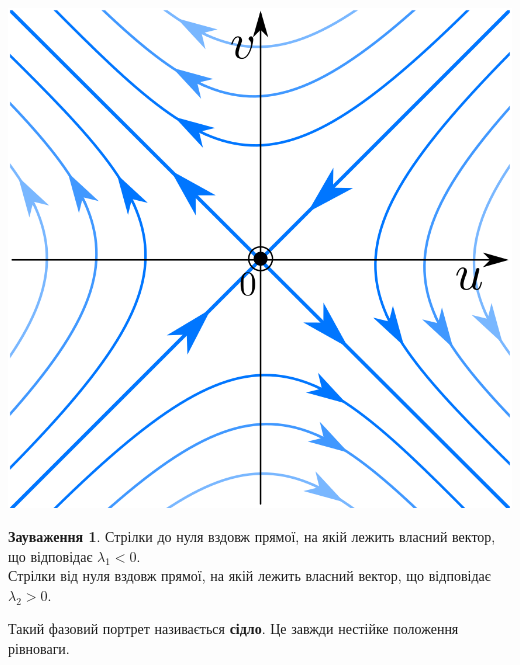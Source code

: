 \documentclass[14pt,a4paper]{scrartcl}
\theoremstyle{definition}
\newtheorem*{remark}{Зауваження}
\theoremstyle{definition}
\theoremstyle{definition}
\begin{document}
\begin{center} \includegraphics[scale=0.3]{assets/lectures_recent-0ebe704d.png} \end{center}

\begin{remark}
    Стрілки до нуля вздовж прямої, на якій лежить власний вектор, що відповідає $ \lambda_1 < 0$.\\
    Стрілки від нуля вздовж прямої, на якій лежить власний вектор, що відповідає $ \lambda_2 > 0$.
\end{remark}
Такий фазовий портрет називається \textbf{сідло}. Це завжди нестійке положення рівноваги.
\end{document}
